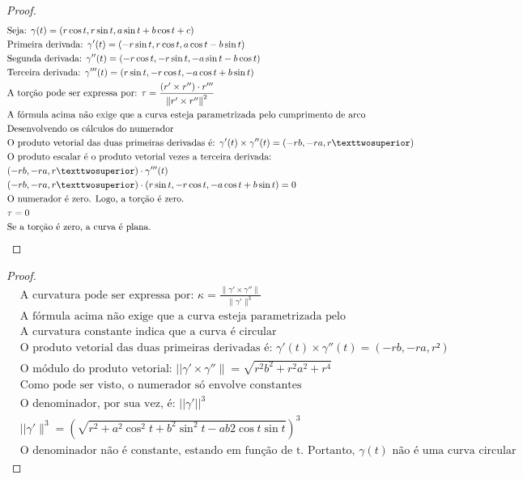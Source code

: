 \documentclass[fleqn]{article}
\begin{document}
\begin{proof}
  \begin{align*}
  &  \text{Seja: } \gamma(t) =  (r \cos t,r\sin t, a\sin t + b\cos t +c)  \\
   & \text{Primeira derivada: }\gamma'(t) = (-r\sin t,r\cos t,   a\cos t - b\sin t)  \\
   & \text{Segunda derivada: }\gamma''(t) = (-r\cos t,-r\sin t,    -a\sin t - b\cos t)  \\
   & \text{Terceira derivada: }\gamma'''(t) = (r\sin t,-r\cos t, -a\cos t + b\sin t)  \\
   & \text{A torção pode ser expressa por: }\tau  = {{\left(   {r' \times r''} \right) \cdot r'''} \over {\left\| {r' \times r''} \right\|^2}}\\
   & \text{A fórmula acima não exige que a curva esteja      parametrizada pelo cumprimento   de arco} \\
   & \text{Desenvolvendo os cálculos do numerador}  \\
   & \text{O produto vetorial das duas primeiras derivadas é:  } {\gamma'(t) \times \gamma''(t)= (-rb, -  ra, r²)}\\
   & \text{O produto escalar é o produto vetorial vezes a   terceira derivada: } \\
   & (-rb, -ra, r²)\cdot \gamma'''(t)  \\
   & (-rb, -ra, r²)\cdot (r\sin t,-r\cos t, -a\cos t + b\sin t)   = 0 \\
   & \text{O numerador é zero. Logo, a torção é zero. } \\
   & \tau = 0 \\
   & \text{Se a torção é zero, a curva é plana.} 
  \end{align*}
\end{proof}


\begin{proof}
\begin{align*}
  & \text{A curvatura pode ser expressa por: }\kappa = \frac{\|\gamma' \times \gamma''\|}{\|\gamma'\|^3}\\
  & \text{A fórmula acima não exige que a curva esteja  parametrizada pelo cumprimento   de arco} \\
  & \text{A curvatura constante indica que a curva é circular} \\
  & \text{O produto vetorial das duas primeiras derivadas é:  }{\gamma'(t) \times \gamma''(t)= (-rb, -  ra, r²)}\\ 
  & \text{O módulo do produto vetorial: } ||\gamma' \times \gamma''\| = \sqrt{r^2b^2+r^2a^2+r^4}  \\
  & \text{Como pode ser visto, o numerador só envolve constantes} \\
  &\text{O denominador, por sua vez, é: } ||\gamma'| |^3 \\
  & ||\gamma'\|^3 = (\sqrt{r^2+a^2 \cos ^2 t + b^2 \sin ^2 t - ab2 \cos t \sin t })^3 \\
  & \text{O denominador não é constante, estando em função de t. Portanto, } \gamma (t) \text{ não é uma curva circular}
\end{align*}
\end{proof}
\end{document}
